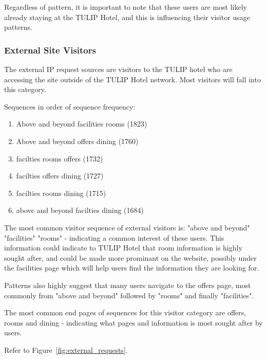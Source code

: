 Regardless of pattern, it is important to note that these users are most likely already staying at the TULIP Hotel, and this is influencing their visitor usage patterns.


\subsubsection{External Site Visitors}

The external IP request sources are visitors to the TULIP hotel who are accessing the site outside of the TULIP Hotel network. Most visitors will fall into this category.

\label{sec:results:ip_source:external}

Sequences in order of sequence frequency:
\begin{enumerate}
  \item Above and beyond \ra facilities \ra rooms (1823)
  \item Above and beyond \ra offers \ra dining (1760)
  \item facilties \ra rooms \ra offers (1732)
  \item facilties \ra offers \ra dining (1727)
  \item facilties \ra rooms \ra dining (1715)
  \item above and beyond \ra facilties \ra dining (1684)
\end{enumerate}

The most common visitor sequence of external visitors is: "above and beyond" \ra  "facilities" \ra  "rooms" - indicating a common interest of these users. This information could indicate to TULIP Hotel that room information is highly sought after, and could be made more prominant on the website, possibly under the facilities page which will help users find the information they are looking for.

Patterns also highly suggest that many users navigate to the offers page, most commonly from "above and beyond" followed by "rooms" and finally "facilities".

The most common end pages of sequences for this visitor category are offers, rooms and dining - indicating what pages and information is most sought after by users.

Refer to Figure~\ref{fig:external_requests}.


